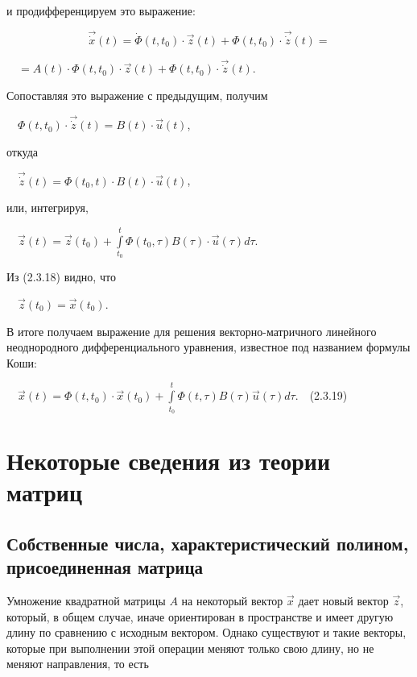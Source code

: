 		и продифференцируем это выражение:


\begin{equation*}
\vec{\dot x}(t)=\dot \Phi (t,t_0)\cdot \vec z(t)+\Phi (t,t_0)\cdot \vec{\dot z}(t)=
\end{equation*}

		\ \     $=A(t)\cdot \Phi (t,t_0)\cdot \vec z(t)+\Phi (t,t_0)\cdot \vec{\dot z}(t)$.



		Сопоставляя это выражение с предыдущим, получим



		\ \  $\Phi (t,t_0)\cdot \vec{\dot z}(t)=B(t)\cdot \vec u(t)$,



		откуда



		\ \  $\vec{\dot z}(t)=\Phi (t_0,t)\cdot B(t)\cdot \vec u(t)$,



		или, интегрируя,



		\ \  $\vec z(t)=\vec z(t_0)+\overset t{\underset{t_0}{\int }}\Phi (t_0,τ)B(τ)\cdot \vec u(τ)\mathit{dτ}$.



		Из (2.3.18) видно, что 



		\ \  $\vec z(t_0)=\vec x(t_0)$. 



		В итоге получаем выражение для решения векторно-матричного линейного неоднородного дифферен­циального уравнения,
		известное под названием формулы Коши:



		\ \  $\vec x(t)=\Phi (t,t_0)\cdot \vec x(t_0)+\overset t{\underset{t_0}{\int }}\Phi (t,τ)B(τ)\vec u(τ)\mathit{dτ}$.\ \ (2.3.19)



\bigskip

\section{Некоторые сведения из теории матриц}
\subsection{Собственные числа, характеристический полином,
	  присоединенная матрица}
\hypertarget{RefHeadingToc455659702}{}
		Умножение квадратной матрицы  $A$ на некоторый вектор  $\vec x$ дает новый вектор  $\vec z$, который, в общем случае,
		иначе ориентирован в про­странстве и имеет другую длину по сравнению с исходным вектором. Однако существуют и такие
		векторы, которые при выполнении этой опе­рации меняют только свою длину, но не меняют направления, то есть



